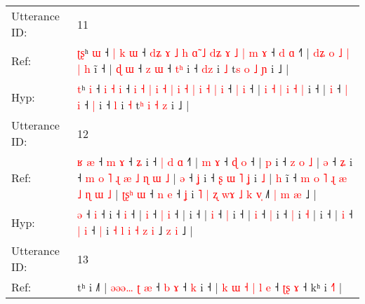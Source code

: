 \documentclass[10pt]{article}
\DeclareRobustCommand{\hl}[1]{{\textcolor{red}{#1}}}
\begin{document}
\begin{longtable}{ll}
 \\
\midrule
Utterance ID: & 11 \\
Ref: & \hl{ʈ}\hl{ʂ}ʰ \hl{ɯ} ˧ \hl{|} \hl{k} \hl{ɯ} ˧ \hl{d}\hl{ʑ} \hl{ɤ} \hl{˩} \hl{h} \hl{ɑ}\hl{̃} \hl{˩} \hl{}\hl{d}\hl{ʑ} \hl{ɤ} \hl{˩} \hl{|} \hl{m} \hl{ɤ} ˧ \hl{d} \hl{ɑ} ˧\hl{˥} | \hl{d}\hl{ʑ} \hl{o} \hl{˩} \hl{|} \hl{|} \hl{h} i\hl{̃} ˧ |\hl{ }\hl{ɖ} \hl{ɯ} ˧ \hl{z} \hl{ɯ} ˧ \hl{t}\hl{ʰ} i ˧ \hl{d}\hl{z} i \hl{˩} t\hl{s} \hl{o} \hl{˩} \hl{ɲ} i ˩ |
 \\
Hyp: & \hl{}\hl{t}ʰ \hl{i} ˧ \hl{i} \hl{˧} \hl{i} ˧ \hl{}\hl{i} \hl{˧} \hl{|} \hl{i} \hl{}\hl{˧} \hl{|} \hl{i}\hl{ }\hl{˧} \hl{|} \hl{i} \hl{˧} \hl{|} \hl{i} ˧ \hl{|} \hl{i} ˧\hl{} | \hl{}\hl{i} \hl{˧} \hl{|} \hl{i} \hl{˧} \hl{|} i\hl{} ˧ |\hl{}\hl{} \hl{i} ˧ \hl{|} \hl{i} ˧ \hl{}\hl{|} i ˧ \hl{}\hl{l} i \hl{˧} t\hl{ʰ} \hl{i} \hl{˧} \hl{z} i ˩ |
 \\
\midrule
Utterance ID: & 12 \\
Ref: & \hl{ʁ}\hl{ }\hl{æ} ˧\hl{ }\hl{m} \hl{ɤ} ˧\hl{ }\hl{ʑ} i ˧\hl{ }\hl{|}\hl{ }\hl{d} \hl{ɑ} ˧\hl{˥} |\hl{ }\hl{m} \hl{ɤ} ˧ \hl{ɖ} \hl{o} ˧ |\hl{ }\hl{p} i ˧\hl{ }\hl{z}\hl{ }\hl{o}\hl{ }\hl{˩} | \hl{ə} ˧ \hl{ʑ} i ˧\hl{ }\hl{m}\hl{ }\hl{o}\hl{ }\hl{˥}\hl{ }\hl{ɻ}\hl{ }\hl{æ}\hl{ }\hl{˩}\hl{ }\hl{ɳ}\hl{ }\hl{ɯ}\hl{ }\hl{˩} | \hl{ə} ˧ \hl{ʝ} i ˧\hl{ }\hl{ʂ}\hl{ }\hl{ɯ}\hl{ }\hl{˥} \hl{ʝ} i \hl{˩} |\hl{ }\hl{h} i\hl{̃} ˧\hl{ }\hl{m}\hl{ }\hl{o}\hl{ }\hl{˥}\hl{ }\hl{ɻ}\hl{ }\hl{æ}\hl{ }\hl{˩}\hl{ }\hl{ɳ}\hl{ }\hl{ɯ}\hl{ }\hl{˩} |\hl{ }\hl{ʈ}\hl{ʂ}\hl{ʰ} \hl{ɯ} ˧ \hl{n} \hl{e} ˧ \hl{ʝ} i\hl{ }\hl{˥} \hl{|} \hl{ʐ} \hl{w}\hl{ɤ} \hl{˩} \hl{k} \hl{v}\hl{̩} ˩\hl{˥}\hl{ }\hl{|} \hl{m} \hl{æ} ˩ |
 \\
Hyp: & \hl{}\hl{}\hl{ə} ˧\hl{}\hl{} \hl{i} ˧\hl{}\hl{} i ˧\hl{}\hl{}\hl{}\hl{} \hl{i} ˧\hl{} |\hl{}\hl{} \hl{i} ˧ \hl{|} \hl{i} ˧ |\hl{}\hl{} i ˧\hl{}\hl{}\hl{}\hl{}\hl{}\hl{} | \hl{i} ˧ \hl{|} i ˧\hl{}\hl{}\hl{}\hl{}\hl{}\hl{}\hl{}\hl{}\hl{}\hl{}\hl{}\hl{}\hl{}\hl{}\hl{}\hl{}\hl{}\hl{} | \hl{i} ˧ \hl{|} i ˧\hl{}\hl{}\hl{}\hl{}\hl{}\hl{} \hl{|} i \hl{˧} |\hl{}\hl{} i\hl{} ˧\hl{}\hl{}\hl{}\hl{}\hl{}\hl{}\hl{}\hl{}\hl{}\hl{}\hl{}\hl{}\hl{}\hl{}\hl{}\hl{}\hl{}\hl{} |\hl{}\hl{}\hl{}\hl{} \hl{i} ˧ \hl{|} \hl{i} ˧ \hl{|} i\hl{}\hl{} \hl{˧} \hl{l} \hl{}\hl{i} \hl{˧} \hl{z} \hl{}\hl{i} ˩\hl{}\hl{}\hl{} \hl{z} \hl{i} ˩ |
 \\
\midrule
Utterance ID: & 13 \\
Ref: & tʰ i ˩˥ | \hl{ə}\hl{ə}\hl{ə}\hl{…} \hl{ʈ} \hl{æ} ˧ \hl{b} \hl{ɤ} ˧ \hl{k} i ˧ |\hl{}\hl{} \hl{k} \hl{ɯ} \hl{˧} \hl{|} \hl{}\hl{l} \hl{e} ˧ \hl{ʈ}\hl{ʂ} \hl{ɤ} ˧ kʰ i \hl{˧}\hl{˥} |

\end{longtable}
\end{document}
